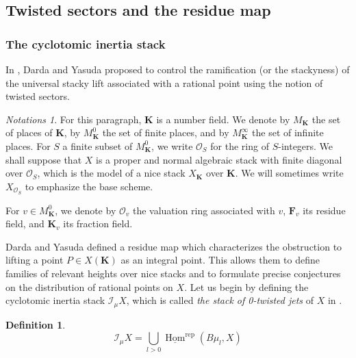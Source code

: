 \documentclass{proc-l}
\newcommand{\K}{\mathbf{K}}
\newcommand{\N}{\mathbf{N}}
\newcommand{\F}{\mathbf{F}}
\newcommand{\I}{\mathcal{I}}
\DeclareMathOperator{\Aut}{Aut}
\DeclareMathOperator{\Hom}{Hom}
\DeclareMathOperator{\rep}{rep}
\newcommand{\sheafI}{\mathcal{I}}
\newcommand{\sheafO}{\mathcal{O}}
\theoremstyle{definition}
\newtheorem{definition}[theorem]{Definition}
\theoremstyle{remark}
\newtheorem{Notations}[theorem]{Notations}
\numberwithin{equation}{section}
\begin{document}



\subsection{Twisted sectors and the residue map}

\subsubsection{The cyclotomic inertia stack}

In \cite{darda2024batyrevmanin}, Darda and Yasuda proposed to control the ramification (or the stackyness) of the universal stacky lift associated with a rational point using the notion of twisted sectors. 

\begin{Notations}
    For this paragraph, $\K$ is a number field. We denote by $M_{\K}$ the set of places of $\K$, by $M_{\K}^0$ the set of finite places, and by $M_{\K}^{\infty}$ the set of infinite places. For $S$ a finite subset of $M_{\K}^0$, we write $\sheafO_S$ for the ring of $S$-integers. We shall suppose that $X$ is a proper and  normal algebraic stack with finite diagonal over $\sheafO_S$, which is the model of a nice stack $X_{\K}$ over $\K$. We will sometimes write $X_{\sheafO_S}$ to emphasize the base scheme.

    For $v \in M_{\K}^0$, we denote by $\sheafO_v$ the valuation ring associated with $v$, $\F_v$ its residue field, and ${\K}_v$ its fraction field. 
\end{Notations}

Darda and Yasuda defined a residue map which characterizes the obstruction to lifting a point $P \in X(\K)$ as an integral point. This allows them to define families of relevant heights over nice stacks and to formulate precise conjectures on the distribution of rational points on $X$. Let us begin by defining the cyclotomic inertia stack $\I_{\mu} X$, which is called \textit{the stack of 0-twisted jets} of $X$ in \cite[definition 2.3]{darda2024batyrevmanin}.

\begin{definition}
    $$ \sheafI_{\mu} X = \bigcup\limits_{l > 0} \underline{\Hom}^{\rep}(B \mu_l,X) $$
\end{definition}
\end{document}
